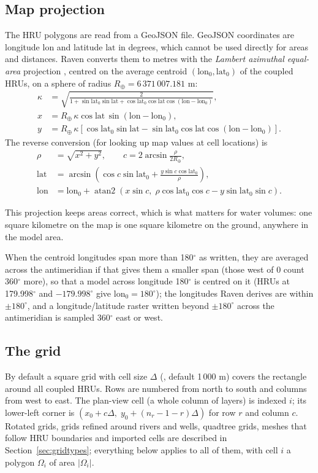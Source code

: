 \subsection{Map projection}
The HRU polygons are read from a GeoJSON file. GeoJSON coordinates are longitude $\mathrm{lon}$ and latitude $\mathrm{lat}$ in
degrees, which cannot be used directly for areas and distances. Raven converts them to metres with the
\emph{Lambert azimuthal equal-area} projection \cite{snyder1987map}, centred on the average centroid
$(\mathrm{lon}_0,\mathrm{lat}_0)$ of the coupled HRUs, on a sphere of radius $R_\oplus=6\,371\,007.181$ m:
\begin{align}
\kappa &= \sqrt{\frac{2}{1+\sin\mathrm{lat}_0\sin\mathrm{lat}+\cos\mathrm{lat}_0\cos\mathrm{lat}\cos(\mathrm{lon}-\mathrm{lon}_0)}},\\
x &= R_\oplus\,\kappa\cos\mathrm{lat}\,\sin(\mathrm{lon}-\mathrm{lon}_0),\\
y &= R_\oplus\,\kappa\left[\cos\mathrm{lat}_0\sin\mathrm{lat}-\sin\mathrm{lat}_0\cos\mathrm{lat}\cos(\mathrm{lon}-\mathrm{lon}_0)\right].
\end{align}
The reverse conversion (for looking up map values at cell locations) is
\begin{align}
\rho&=\sqrt{x^2+y^2},\qquad c=2\arcsin\frac{\rho}{2R_\oplus},\\
\mathrm{lat}&=\arcsin\!\left(\cos c\sin\mathrm{lat}_0+\frac{y\sin c\cos\mathrm{lat}_0}{\rho}\right),\\
\mathrm{lon}&=\mathrm{lon}_0+\operatorname{atan2}\!\left(x\sin c,\;\rho\cos\mathrm{lat}_0\cos c-y\sin\mathrm{lat}_0\sin c\right).
\end{align}
\begin{plain}
This projection keeps areas correct, which is what matters for water volumes: one square kilometre on the map is one
square kilometre on the ground, anywhere in the model area.
\end{plain}
When the centroid longitudes span more than 180$^\circ$ as written, they are averaged across the antimeridian if that
gives them a smaller span (those west of 0 count 360$^\circ$ more), so that a model across longitude 180$^\circ$ is centred on it (HRUs at 179.998$^\circ$ and
$-179.998^\circ$ give $\mathrm{lon}_0=180^\circ$); the longitudes Raven derives are within $\pm180^\circ$, and a
longitude/latitude raster written beyond $\pm180^\circ$ across the antimeridian is sampled 360$^\circ$ east or west.

\subsection{The grid}
By default a square grid with cell size $\Delta$ (, default 1\,000 m) covers the rectangle around all
coupled HRUs. Rows are numbered from north to south and columns from west to east. The plan-view cell (a whole column of
layers) is indexed $i$; its lower-left corner is $(x_0+c\Delta,\;y_0+(n_r-1-r)\Delta)$ for row $r$ and column $c$. Rotated
grids, grids refined around rivers and wells, quadtree grids, meshes that follow HRU boundaries and imported cells are
described in Section~\ref{sec:gridtypes}; everything below applies to all of them, with cell $i$ a polygon $\Omega_i$ of area $|\Omega_i|$.

